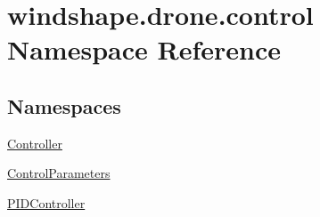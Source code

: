 \hypertarget{namespacewindshape_1_1drone_1_1control}{}\section{windshape.\+drone.\+control Namespace Reference}
\label{namespacewindshape_1_1drone_1_1control}
\subsection*{Namespaces}
\begin{DoxyCompactItemize}
\item 
 \mbox{\hyperlink{namespacewindshape_1_1drone_1_1control_1_1_controller}{Controller}}
\item 
 \mbox{\hyperlink{namespacewindshape_1_1drone_1_1control_1_1_control_parameters}{Control\+Parameters}}
\item 
 \mbox{\hyperlink{namespacewindshape_1_1drone_1_1control_1_1_p_i_d_controller}{P\+I\+D\+Controller}}
\end{DoxyCompactItemize}
